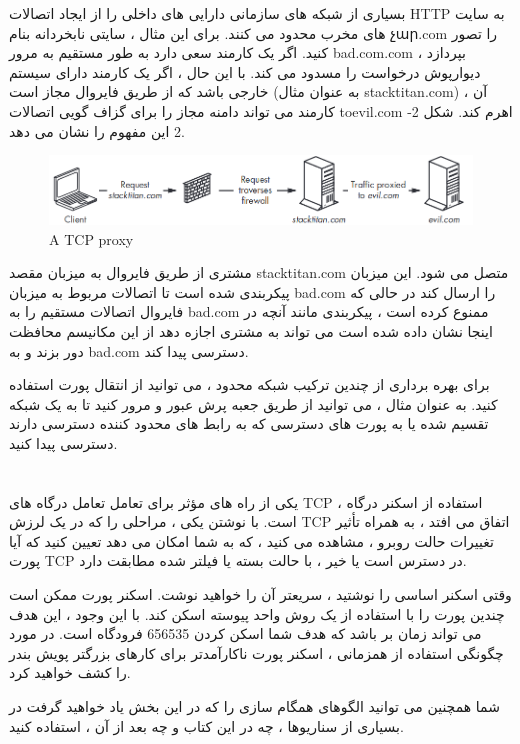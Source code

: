 \documentclass[12pt]{book}
\begin{document}
بسیاری از شبکه های سازمانی دارایی های داخلی را از ایجاد اتصالات HTTP به سایت های مخرب محدود می کنند. برای این مثال ، سایتی نابخردانه بنام չար.com را تصور کنید. اگر یک کارمند سعی دارد به طور مستقیم به مرور bad.com.com بپردازد ، دیوارپوش درخواست را مسدود می کند. با این حال ، اگر یک کارمند دارای سیستم خارجی باشد که از طریق فایروال مجاز است (به عنوان مثال stacktitan.com) ، آن کارمند می تواند دامنه مجاز را برای گزاف گویی اتصالات toevil.com اهرم کند. شکل 2-2 این مفهوم را نشان می دهد.
\begin{figure}
	\caption{A TCP proxy}
	\centering
	\includegraphics[width=1\textwidth]{images/proxy.png}
\end{figure}

مشتری از طریق فایروال به میزبان مقصد stacktitan.com متصل می شود. این میزبان پیکربندی شده است تا اتصالات مربوط به میزبان bad.com را ارسال کند در حالی که فایروال اتصالات مستقیم را به bad.com ممنوع کرده است ، پیکربندی مانند آنچه در اینجا نشان داده شده است می تواند به مشتری اجازه دهد از این مکانیسم محافظت دور بزند و به bad.com دسترسی پیدا کند.

برای بهره برداری از چندین ترکیب شبکه محدود ، می توانید از انتقال پورت استفاده کنید. به عنوان مثال ، می توانید از طریق جعبه پرش عبور و مرور کنید تا به یک شبکه تقسیم شده یا به پورت های دسترسی که به رابط های محدود کننده دسترسی دارند دسترسی پیدا کنید.
\section{}
یکی از راه های مؤثر برای تعامل تعامل درگاه های TCP ، استفاده از اسکنر درگاه است. با نوشتن یکی ، مراحلی را که در یک لرزش TCP اتفاق می افتد ، به همراه تأثیر تغییرات حالت روبرو ، مشاهده می کنید ، که به شما امکان می دهد تعیین کنید که آیا پورت TCP در دسترس است یا خیر ، با حالت بسته یا فیلتر شده مطابقت دارد.

وقتی اسکنر اساسی را نوشتید ، سریعتر آن را خواهید نوشت. اسکنر پورت ممکن است چندین پورت را با استفاده از یک روش واحد پیوسته اسکن کند. با این وجود ، این هدف می تواند زمان بر باشد که هدف شما اسکن کردن 656535 فرودگاه است. در مورد چگونگی استفاده از همزمانی ، اسکنر پورت ناکارآمدتر برای کارهای بزرگتر پویش بندر را کشف خواهید کرد.

شما همچنین می توانید الگوهای همگام سازی را که در این بخش یاد خواهید گرفت در بسیاری از سناریوها ، چه در این کتاب و چه بعد از آن ، استفاده کنید.
\end{document}
